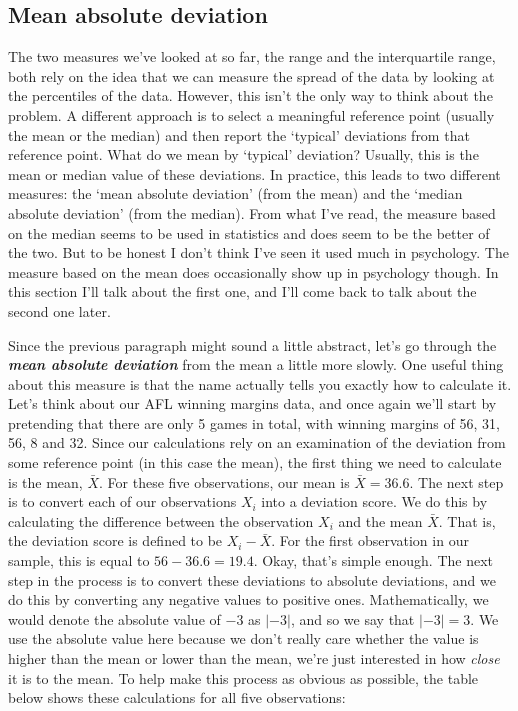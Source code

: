 \documentclass[
]{book}
\begin{document}
\hypertarget{aad}{%
\subsection{Mean absolute deviation}\label{aad}}

The two measures we've looked at so far, the range and the interquartile range, both rely on the idea that we can measure the spread of the data by looking at the percentiles of the data. However, this isn't the only way to think about the problem. A different approach is to select a meaningful reference point (usually the mean or the median) and then report the `typical' deviations from that reference point. What do we mean by `typical' deviation? Usually, this is the mean or median value of these deviations. In practice, this leads to two different measures: the `mean absolute deviation' (from the mean) and the `median absolute deviation' (from the median). From what I've read, the measure based on the median seems to be used in statistics and does seem to be the better of the two. But to be honest I don't think I've seen it used much in psychology. The measure based on the mean does occasionally show up in psychology though. In this section I'll talk about the first one, and I'll come back to talk about the second one later.

Since the previous paragraph might sound a little abstract, let's go through the \textbf{\emph{mean absolute deviation}} from the mean a little more slowly. One useful thing about this measure is that the name actually tells you exactly how to calculate it. Let's think about our AFL winning margins data, and once again we'll start by pretending that there are only 5 games in total, with winning margins of 56, 31, 56, 8 and 32. Since our calculations rely on an examination of the deviation from some reference point (in this case the mean), the first thing we need to calculate is the mean, \(\bar{X}\). For these five observations, our mean is \(\bar{X} = 36.6\). The next step is to convert each of our observations \(X_i\) into a deviation score. We do this by calculating the difference between the observation \(X_i\) and the mean \(\bar{X}\). That is, the deviation score is defined to be \(X_i - \bar{X}\). For the first observation in our sample, this is equal to \(56 - 36.6 = 19.4\). Okay, that's simple enough. The next step in the process is to convert these deviations to absolute deviations, and we do this by converting any negative values to positive ones. Mathematically, we would denote the absolute value of \(-3\) as \(|-3|\), and so we say that \(|-3| = 3\). We use the absolute value here because we don't really care whether the value is higher than the mean or lower than the mean, we're just interested in how \emph{close} it is to the mean. To help make this process as obvious as possible, the table below shows these calculations for all five observations:
\end{document}
